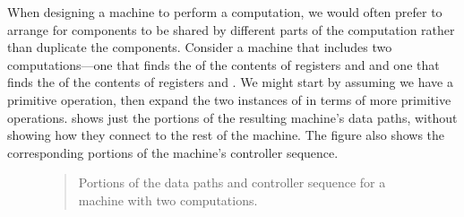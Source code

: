 When designing a machine to perform a computation, we would often prefer to
arrange for components to be shared by different parts of the computation
rather than duplicate the components.  Consider a machine that includes two
 computations---one that finds the  of the contents
of registers  and  and one that finds the  of the
contents of registers  and .  We might start by assuming we
have a primitive  operation, then expand the two instances of
 in terms of more primitive operations.   shows just
the  portions of the resulting machine's data paths, without
showing how they connect to the rest of the machine.  The figure also shows the
corresponding portions of the machine's controller sequence.

\begin{figure}[tb]
\label{Figure 5.7}
\centering
\begin{comment}
\heading{Figure 5.7:} Portions of the data paths and controller sequence for a machine with two \acronym{GCD} computations.

\begin{example}
                            ___                                 ___
+-----+        +-----+     /   \    +-----+        +-----+     /   \
|  a  |<-(X)---+  b  |--->|  =  |   |  c  |<-(X)---+  d  |--->|  =  |
+--+--+  a<-b  ++----+     \___/    +--+--+  c<-d  ++----+     \___/
   |            |  ^         ^         |            |  ^         ^
   `----.   .---'  |         |         `----.   .---'  |         |
        V   V     (X) b<-t   |              V   V     (X) d<-t   |
       -------     |        / \            -------     |        / \
       \ rem /     |       /_0_\           \ rem /     |       /_0_\
        --+--      |                        --+--      |
          |        |                          |        |
         (X) t<-r  |                         (X) s<-r  |
          |        |                          |        |
          V        |                          V        |
       +-----+     |                       +-----+     |
       |  t  +-----'                       |  s  +-----'
       +-----+                             +-----+
\end{example}

\begin{scheme}
gcd-1
 (test (op =) (reg b) (const 0))
 (branch (label after-gcd-1))
 (assign t (op rem) (reg a) (reg b))
 (assign a (reg b))
 (assign b (reg t))
 (goto (label gcd-1))
after-gcd-1
   ~\( \dots \)~
gcd-2
 (test (op =) (reg d) (const 0))
 (branch (label after-gcd-2))
 (assign s (op rem) (reg c) (reg d))
 (assign c (reg d))
 (assign d (reg s))
 (goto (label gcd-2))
after-gcd-2
\end{scheme}

\end{comment}

\begin{quote}
 Portions of the data paths and controller sequence for a \mbox{machine} with two  computations.
\end{quote}
\end{figure}

